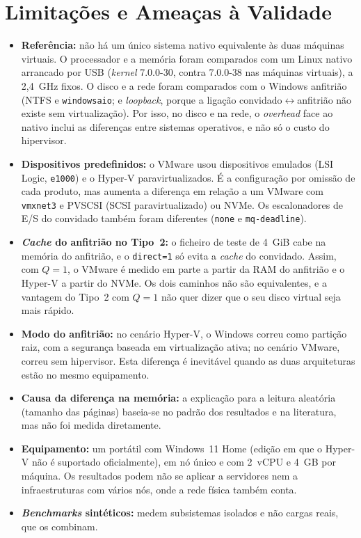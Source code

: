 \documentclass[conference]{IEEEtran}
\begin{document}
\section{Limitações e Ameaças à Validade}\label{sec_lim}
\begin{itemize}
\item \textbf{Referência:} não há um único sistema nativo equivalente às duas máquinas virtuais. O processador e a memória foram comparados com um Linux nativo arrancado por USB (\textit{kernel} 7.0.0-30, contra 7.0.0-38 nas máquinas virtuais), a 2,4~GHz fixos. O disco e a rede foram comparados com o Windows anfitrião (NTFS e \texttt{windowsaio}; e \textit{loopback}, porque a ligação convidado$\leftrightarrow$anfitrião não existe sem virtualização). Por isso, no disco e na rede, o \textit{overhead} face ao nativo inclui as diferenças entre sistemas operativos, e não só o custo do hipervisor.
\item \textbf{Dispositivos predefinidos:} o VMware usou dispositivos emulados (LSI Logic, \texttt{e1000}) e o Hyper-V paravirtualizados. É a configuração por omissão de cada produto, mas aumenta a diferença em relação a um VMware com \texttt{vmxnet3} e PVSCSI (SCSI paravirtualizado) ou NVMe. Os escalonadores de E/S do convidado também foram diferentes (\texttt{none} e \texttt{mq-deadline}).
\item \textbf{\textit{Cache} do anfitrião no Tipo~2:} o ficheiro de teste de 4~GiB cabe na memória do anfitrião, e o \texttt{direct=1} só evita a \textit{cache} do convidado. Assim, com $Q=1$, o VMware é medido em parte a partir da RAM do anfitrião e o Hyper-V a partir do NVMe. Os dois caminhos não são equivalentes, e a vantagem do Tipo~2 com $Q=1$ não quer dizer que o seu disco virtual seja mais rápido.
\item \textbf{Modo do anfitrião:} no cenário Hyper-V, o Windows correu como partição raiz, com a segurança baseada em virtualização ativa; no cenário VMware, correu sem hipervisor. Esta diferença é inevitável quando as duas arquiteturas estão no mesmo equipamento.
\item \textbf{Causa da diferença na memória:} a explicação para a leitura aleatória (tamanho das páginas) baseia-se no padrão dos resultados e na literatura, mas não foi medida diretamente.
\item \textbf{Equipamento:} um portátil com Windows~11 Home (edição em que o Hyper-V não é suportado oficialmente), em nó único e com 2~vCPU e 4~GB por máquina. Os resultados podem não se aplicar a servidores nem a infraestruturas com vários nós, onde a rede física também conta.
\item \textbf{\textit{Benchmarks} sintéticos:} medem subsistemas isolados e não cargas reais, que os combinam.
\end{itemize}
\end{document}
